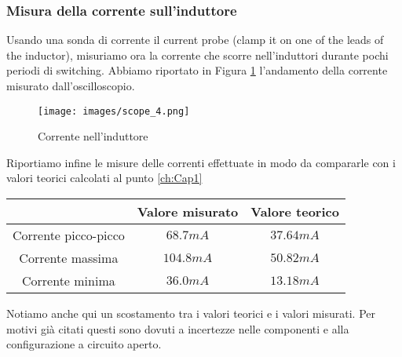 \subsubsection{Misura della corrente sull'induttore}
Usando una sonda di corrente il current probe (clamp it on one of the leads of the inductor), misuriamo ora la corrente che scorre nell'induttori durante pochi periodi di switching. Abbiamo riportato in Figura \ref{fig:CurrentInductor1} l'andamento della corrente misurato dall'oscilloscopio.
\begin{figure}[H]
    \centering
    \texttt{[image: images/scope\_4.png]}
    \caption{Corrente nell'induttore}
    \label{fig:CurrentInductor1}
\end{figure}
Riportiamo infine le misure delle correnti effettuate in modo da compararle con i valori teorici calcolati al punto \ref{ch:Cap1}
\begin{table}[H]
    \centering
    \begin{tabular}{|c|c|c|}
        \hline
        &Valore misurato&Valore teorico\\\hline\hline
        Corrente picco-picco&$68.7mA$&$37.64mA$\\\hline
        Corrente massima&$104.8mA$&$50.82mA$\\\hline
        Corrente minima&$36.0mA$&$13.18mA$\\\hline
    \end{tabular}
\end{table}
Notiamo anche qui un scostamento tra i valori teorici e i valori misurati. Per motivi già citati questi sono dovuti a incertezze nelle componenti e alla configurazione a circuito aperto.
\clearpage
